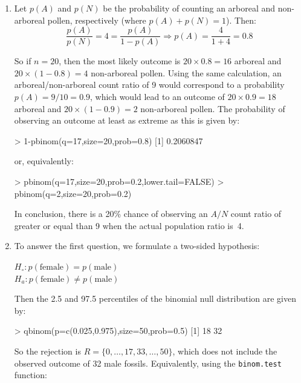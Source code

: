 \begin{enumerate}

\item Let $p(A)$ and $p(N)$ be the probability of counting an arboreal
  and non-arboreal pollen, respectively (where $p(A)+p(N)=1$). Then:
  \[
  \frac{p(A)}{p(N)} = 4 = \frac{p(A)}{1-p(A)}
  \Rightarrow p(A) = \frac{4}{1+4} = 0.8
  \]

  So if $n=20$, then the most likely outcome is $20\times{0.8}=16$
  arboreal and $20\times{(1-0.8)}=4$ non-arboreal pollen. Using the
  same calculation, an arboreal/non-arboreal count ratio of 9 would
  correspond to a probability $p(A)=9/10=0.9$, which would lead to an
  outcome of $20\times{0.9}=18$ arboreal and $20\times{(1-0.9)}=2$
  non-arboreal pollen. The probability of observing an outcome at
  least as extreme as this is given by:

\begin{console}
> 1-pbinom(q=17,size=20,prob=0.8)
[1] 0.2060847
\end{console}

or, equivalently:

\begin{console}
> pbinom(q=17,size=20,prob=0.2,lower.tail=FALSE)
> pbinom(q=2,size=20,prob=0.2)
\end{console}

In conclusion, there is a 20\% chance of observing an $A/N$ count
ratio of greater or equal than 9 when the actual population ratio
is~4.
  
\item To answer the first question, we formulate a two-sided
  hypothesis:

  $H_\circ: p(\mbox{female}) = p(\mbox{male})$\\
  $H_a: p(\mbox{female}) \neq p(\mbox{male})$

  Then the 2.5 and 97.5 percentiles of the binomial null distribution
  are given by:

\begin{console}
> qbinom(p=c(0.025,0.975),size=50,prob=0.5)
[1] 18 32
\end{console}

So the rejection is $R=\{0,\ldots,17,33,\ldots,50\}$, which does not
include the observed outcome of 32 male fossils. Equivalently, using
the \texttt{binom.test} function:
  


\end{enumerate}
